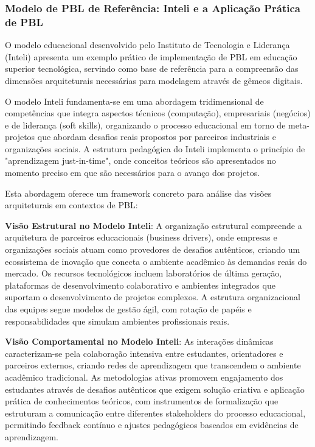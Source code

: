 \documentclass[12pt,a4paper]{article}
\renewcommand{\cite}[1]{}
\begin{document}
\subsubsection{Modelo de PBL de Referência: Inteli e a Aplicação Prática de PBL}

O modelo educacional desenvolvido pelo Instituto de Tecnologia e Liderança
(Inteli) \cite{inteli2024} apresenta um exemplo prático de implementação de PBL
em educação superior tecnológica, servindo como base de referência para a
compreensão das dimensões arquiteturais necessárias para modelagem através de
gêmeos digitais.

O modelo Inteli fundamenta-se em uma abordagem tridimensional de competências
que integra aspectos técnicos (computação), empresariais (negócios) e de
liderança (soft skills), organizando o processo educacional em torno de
meta-projetos que abordam desafios reais propostos por parceiros industriais e
organizações sociais. A estrutura pedagógica do Inteli implementa o princípio
de "aprendizagem just-in-time", onde conceitos teóricos são apresentados no
momento preciso em que são necessários para o avanço dos projetos.

Esta abordagem oferece um framework concreto para análise das visões
arquiteturais em contextos de PBL:

\textbf{Visão Estrutural no Modelo Inteli}: A organização estrutural compreende a arquitetura de parceiros educacionais (business drivers), onde empresas e organizações sociais atuam como provedores de desafios autênticos, criando um ecossistema de inovação que conecta o ambiente acadêmico às demandas reais do mercado. Os recursos tecnológicos incluem laboratórios de última geração, plataformas de desenvolvimento colaborativo e ambientes integrados que suportam o desenvolvimento de projetos complexos. A estrutura organizacional das equipes segue modelos de gestão ágil, com rotação de papéis e responsabilidades que simulam ambientes profissionais reais.

\textbf{Visão Comportamental no Modelo Inteli}: As interações dinâmicas caracterizam-se pela colaboração intensiva entre estudantes, orientadores e parceiros externos, criando redes de aprendizagem que transcendem o ambiente acadêmico tradicional. As metodologias ativas promovem engajamento dos estudantes através de desafios autênticos que exigem solução criativa e aplicação prática de conhecimentos teóricos, com instrumentos de formalização que estruturam a comunicação entre diferentes stakeholders do processo educacional, permitindo feedback contínuo e ajustes pedagógicos baseados em evidências de aprendizagem.
\end{document}
